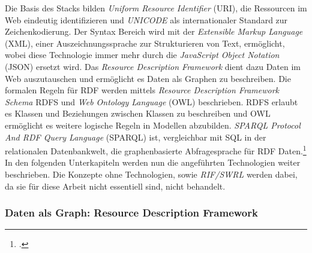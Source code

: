 \documentclass[12pt,a4paper]{article}
\begin{document}
Die Basis des Stacks bilden \textit{Uniform Resource Identifier} (URI), die Ressourcen im Web eindeutig identifizieren und \textit{UNICODE} als internationaler Standard zur Zeichenkodierung. Der Syntax Bereich wird mit der \textit{Extensible Markup Language} (XML), einer Auszeichnungssprache zur Strukturieren von Text, ermöglicht, wobei diese Technologie immer mehr durch die \textit{JavaScript Object Notation} (JSON) ersetzt wird. Das \textit{Resource Description Framework} dient dazu Daten im Web auszutauschen und ermöglicht es Daten als Graphen zu beschreiben. Die formalen Regeln für RDF werden mittels \textit{Resource Description Framework Schema} RDFS und \textit{Web Ontology Language} (OWL) beschrieben. RDFS erlaubt es Klassen und Beziehungen zwischen Klassen zu beschreiben und OWL ermöglicht es weitere logische Regeln in Modellen abzubilden. \textit{SPARQL Protocol And RDF Query Language} (SPARQL) ist, vergleichbar mit SQL in der relationalen Datenbankwelt, die graphenbasierte Abfragesprache für RDF Daten.\footcite[][]{horrocks2005semantic}
\\
In den folgenden Unterkapiteln werden nun die angeführten Technologien weiter beschrieben. Die Konzepte ohne Technologien, sowie \textit{RIF/SWRL} werden dabei, da sie für diese Arbeit nicht essentiell sind, nicht behandelt.


\subsubsection{Daten als Graph: Resource Description Framework}
\end{document}
